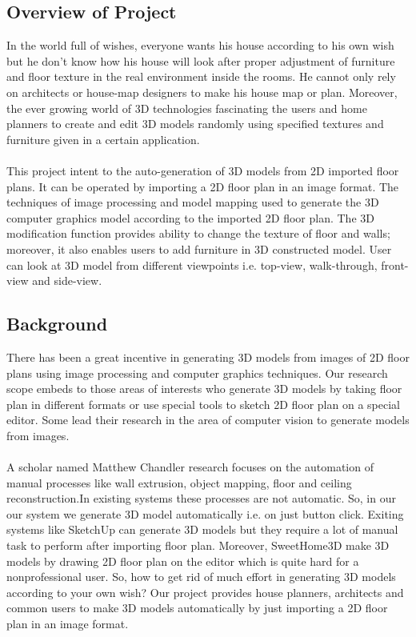 \documentclass{article}
\begin{document}
\subsection{Overview of Project}
In the world full of wishes, everyone wants his house according to his own wish but he don't know how his house will look after proper adjustment of furniture and floor texture in the real environment inside the rooms. He cannot only rely on architects or house-map designers to make his house map or plan. Moreover, the ever growing world of 3D technologies fascinating the users and home planners to create and edit 3D models randomly using specified textures and furniture given in a certain application.
\\
\\
This project intent to the auto-generation of 3D models from 2D imported floor plans. It can be operated by importing a 2D floor plan in an image format. The techniques of image processing and model mapping used to generate the 3D computer graphics model according to the imported 2D floor plan. The 3D modification function provides ability to change the texture of floor and walls; moreover, it also enables users to add furniture in 3D constructed model. User can look at 3D model from different viewpoints i.e. top-view, walk-through, front-view and side-view.
\subsection{Background}
There has been a great incentive in generating 3D models from images of 2D floor plans using image processing\cite{ImageP} and computer graphics techniques. Our research scope embeds to those areas of interests who generate 3D models by taking floor plan in different formats or use special tools  to sketch 2D floor plan on a special editor. Some lead their research in the area of computer vision to generate models from images.
\\
\\
A scholar named Matthew Chandler research focuses on the automation of manual processes like wall extrusion, object mapping, floor and ceiling reconstruction\cite{abc}.In existing systems these processes are not automatic. So, in our our system we generate 3D model automatically i.e. on just button click.
Exiting systems like SketchUp can generate 3D models but they require a lot of manual task to perform after importing floor plan. Moreover, SweetHome3D make 3D models by drawing 2D floor plan on the editor which is quite hard for a nonprofessional user. So, how to get rid of much effort in generating 3D models according to your own wish?
Our project provides house planners, architects and common users to make 3D models automatically by just importing a 2D floor plan in an image format.
\end{document}
